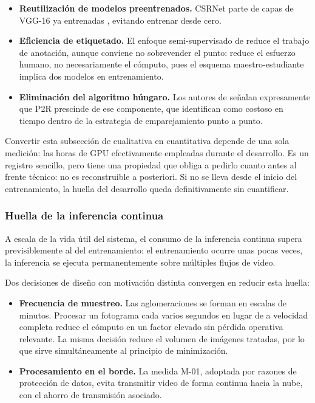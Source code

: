 \begin{itemize}[leftmargin=1.5em,itemsep=0.3em]
  \item \textbf{Reutilización de modelos preentrenados.} CSRNet parte de
        capas de VGG-16 ya entrenadas \cite{Li_2018_CVPR}, evitando
        entrenar desde cero.
  \item \textbf{Eficiencia de etiquetado.} El enfoque semi-supervisado de
        \cite{Lin_2025_CVPR} reduce el trabajo de anotación, aunque
        conviene no sobrevender el punto: reduce el esfuerzo humano, no
        necesariamente el cómputo, pues el esquema maestro-estudiante
        implica dos modelos en entrenamiento.
  \item \textbf{Eliminación del algoritmo húngaro.} Los autores de
        \cite{Lin_2025_CVPR} señalan expresamente que P2R prescinde de
        ese componente, que identifican como costoso en tiempo dentro de
        la estrategia de emparejamiento punto a punto.
\end{itemize}

Convertir esta subsección de cualitativa en cuantitativa depende de una
sola medición: las horas de GPU efectivamente empleadas durante el
desarrollo. Es un registro sencillo, pero tiene una propiedad que obliga
a pedirlo cuanto antes al frente técnico: no es reconstruible a
posteriori. Si no se lleva desde el inicio del entrenamiento, la huella
del desarrollo queda definitivamente sin cuantificar.

\subsubsection{Huella de la inferencia continua}

A escala de la vida útil del sistema, el consumo de la inferencia
continua supera previsiblemente al del entrenamiento: el entrenamiento
ocurre unas pocas veces, la inferencia se ejecuta permanentemente sobre
múltiples flujos de video.

Dos decisiones de diseño con motivación distinta convergen en reducir
esta huella:

\begin{itemize}[leftmargin=1.5em,itemsep=0.3em]
  \item \textbf{Frecuencia de muestreo.} Las aglomeraciones se forman en
        escalas de minutos. Procesar un fotograma cada varios segundos en
        lugar de a velocidad completa reduce el cómputo en un factor
        elevado sin pérdida operativa relevante. La misma decisión reduce
        el volumen de imágenes tratadas, por lo que sirve simultáneamente
        al principio de minimización.
  \item \textbf{Procesamiento en el borde.} La medida M-01, adoptada por
        razones de protección de datos, evita transmitir video de forma
        continua hacia la nube, con el ahorro de transmisión asociado.
\end{itemize}


